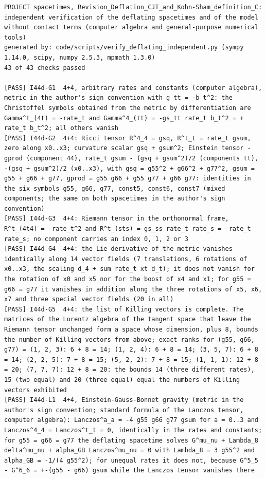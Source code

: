 \documentclass[
  10pt,
]{article}
\begin{document}
\begin{verbatim}
PROJECT spacetimes, Revision_Deflation_CJT_and_Kohn-Sham_definition_C: independent verification of the deflating spacetimes and of the model without contact terms (computer algebra and general-purpose numerical tools)
generated by: code/scripts/verify_deflating_independent.py (sympy 1.14.0, scipy, numpy 2.5.3, mpmath 1.3.0)
43 of 43 checks passed

[PASS] I44d-G1  4+4, arbitrary rates and constants (computer algebra), metric in the author's sign convention with g_tt = -b_t^2: the Christoffel symbols obtained from the metric by differentiation are Gamma^t_(4t) = -rate_t and Gamma^4_(tt) = -gs_tt rate_t b_t^2 = + rate_t b_t^2; all others vanish
[PASS] I44d-G2  4+4: Ricci tensor R^4_4 = gsq, R^t_t = rate_t gsum, zero along x0..x3; curvature scalar gsq + gsum^2; Einstein tensor -gprod (component 44), rate_t gsum - (gsq + gsum^2)/2 (components tt), -(gsq + gsum^2)/2 (x0..x3), with gsq = g55^2 + g66^2 + g77^2, gsum = g55 + g66 + g77, gprod = g55 g66 + g55 g77 + g66 g77: identities in the six symbols g55, g66, g77, const5, const6, const7 (mixed components; the same on both spacetimes in the author's sign convention)
[PASS] I44d-G3  4+4: Riemann tensor in the orthonormal frame, R^t_(4t4) = -rate_t^2 and R^t_(sts) = gs_ss rate_t rate_s = -rate_t rate_s; no component carries an index 0, 1, 2 or 3
[PASS] I44d-G4  4+4: the Lie derivative of the metric vanishes identically along 14 vector fields (7 translations, 6 rotations of x0..x3, the scaling d_4 + sum rate_t xt d_t); it does not vanish for the rotation of x0 and x5 nor for the boost of x4 and x1; for g55 = g66 = g77 it vanishes in addition along the three rotations of x5, x6, x7 and three special vector fields (20 in all)
[PASS] I44d-G5  4+4: the list of Killing vectors is complete. The matrices of the Lorentz algebra of the tangent space that leave the Riemann tensor unchanged form a space whose dimension, plus 8, bounds the number of Killing vectors from above; exact ranks for (g55, g66, g77) = (1, 2, 3): 6 + 8 = 14; (1, 2, 4): 6 + 8 = 14; (3, 5, 7): 6 + 8 = 14; (2, 2, 5): 7 + 8 = 15; (5, 2, 2): 7 + 8 = 15; (1, 1, 1): 12 + 8 = 20; (7, 7, 7): 12 + 8 = 20: the bounds 14 (three different rates), 15 (two equal) and 20 (three equal) equal the numbers of Killing vectors exhibited
[PASS] I44d-L1  4+4, Einstein-Gauss-Bonnet gravity (metric in the author's sign convention; standard formula of the Lanczos tensor, computer algebra): Lanczos^a_a = -4 g55 g66 g77 gsum for a = 0..3 and Lanczos^4_4 = Lanczos^t_t = 0, identically in the rates and constants; for g55 = g66 = g77 the deflating spacetime solves G^mu_nu + Lambda_8 delta^mu_nu + alpha_GB Lanczos^mu_nu = 0 with Lambda_8 = 3 g55^2 and alpha_GB = -1/(4 g55^2); for unequal rates it does not, because G^5_5 - G^6_6 = +-(g55 - g66) gsum while the Lanczos tensor vanishes there

\end{verbatim}
\end{document}
